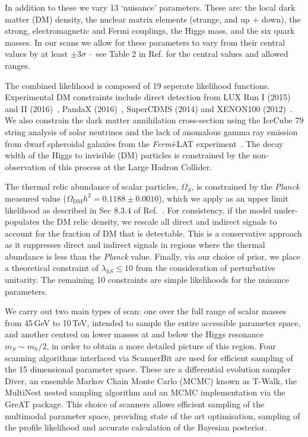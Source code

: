 \documentclass{PoS}
\newcommand{\multinest}{\textsf{MultiNest}\xspace}
\newcommand\great{\textsf{GreAT}\xspace}
\newcommand\twalk{\textsf{T-Walk}\xspace}
\newcommand\diver{\textsf{Diver}\xspace}
\newcommand{\sss}{\scriptscriptstyle}
\newcommand{\ms}{m_{\sss S}}
\newcommand{\lhs}{\lambda_{h\sss S}}
\newcommand{\mh}{m_h}
\newcommand{\scannerbit}{\textsf{ScannerBit}\xspace}
\begin{document}
In addition to these we vary 13 `nuisance' parameters.  These are: the local dark matter (DM) density, the nuclear matrix elements (strange, and up + down), the strong, electromagnetic and Fermi couplings, the Higgs mass, and the six quark masses.  In our scans we allow for these parameters to vary from their central values by at least $\pm3\sigma$ --  see Table 2 in Ref. \cite{Athron:2017kgt} for the central values and allowed ranges.

The combined likelihood is composed of 19 seperate likelihood functions.  Experimental DM constraints include direct detection from LUX Run I (2015) and II (2016)~\cite{LUX2016,LUXrun2}, PandaX (2016)~\cite{PandaX2016}, SuperCDMS (2014) \cite{SuperCDMS}  and XENON100 (2012)~\cite{XENON2013}.  We also constrain the dark matter annihilation cross-section using the IceCube 79 string analysis \cite{IC79,IC79_SUSY} of solar neutrinos and the lack of anomalous gamma ray emission from dwarf spheroidal galaxies from the \textit{Fermi}-LAT experiment~\cite{LATdwarfP8}.  The decay width of the Higgs to invisible (DM) particles is constrained by the non-observation of this process at the Large Hadron Collider.

The thermal relic abundance of scalar particles, $\Omega_S$, is constrained by the \textit{Planck} \cite{Planck15cosmo} measured value ($\Omega_\text{DM} h^2 = 0.1188\pm 0.0010$), which we apply as an upper limit likelihood as described in Sec 8.3.4 of Ref.\ \cite{Athron:2017ard}.  For consistency, if the model under-populates the DM relic density, we rescale all direct and indirect signals to account for the fraction of DM that is detectable.  This is a conservative approach as it suppresses direct and indirect signals in regions where the thermal abundance is less than the \textit{Planck} value.  Finally, via our choice of prior, we place a theoretical constraint of $\lhs\leq10$ from the consideration of perturbative unitarity.  The remaining 10 constraints are simple likelihoods for the nuisance parameters.

We carry out two main types of scan: one over the full range of scalar masses from 45\,GeV to 10\,TeV, intended to sample the entire accessible parameter space, and another centred on lower masses at and below the Higgs resonance $\ms\sim \mh/2$, in order to obtain a more detailed picture of this region.  Four scanning algorithms interfaced via \scannerbit \cite{Workgroup:2017htr} are used for efficient sampling of the 15 dimensional parameter space.  These are a differential evolution sampler \diver \cite{Workgroup:2017htr}, an ensemble Markov Chain Monte Carlo (MCMC) known as \twalk \cite{Workgroup:2017htr}, the \multinest nested sampling algorithm \cite{Feroz:2008xx} and an MCMC implementation via the \great \cite{great} package.  This choice of scanners allows efficient sampling of the multimodal parameter space, providing state of the art optimisation, sampling of the profile likelihood and accurate calculation of the Bayesian posterior.
\end{document}
